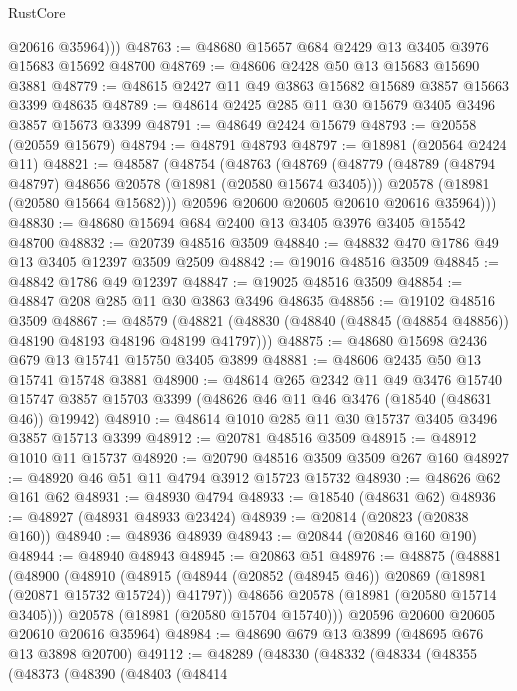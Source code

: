 \begin{lexlean}{RustCore}
\begin{coremodule}
          @20616
          @35964)))
@48763 := @48680 @15657 @684 @2429 @13 @3405 @3976 @15683 @15692 @48700
@48769 := @48606 @2428 @50 @13 @15683 @15690 @3881
@48779 := @48615 @2427 @11 @49 @3863 @15682 @15689 @3857 @15663 @3399 @48635
@48789 := @48614 @2425 @285 @11 @30 @15679 @3405 @3496 @3857 @15673 @3399
@48791 := @48649 @2424 @15679
@48793 := @20558 (@20559 @15679)
@48794 := @48791 @48793
@48797 := @18981 (@20564 @2424 @11)
@48821 := @48587
    (@48754
      (@48763
        (@48769
          (@48779
            (@48789 (@48794 @48797) @48656 @20578 (@18981 (@20580 @15674 @3405)))
            @20578
            (@18981 (@20580 @15664 @15682)))
          @20596
          @20600
          @20605
          @20610
          @20616
          @35964)))
@48830 := @48680 @15694 @684 @2400 @13 @3405 @3976 @3405 @15542 @48700
@48832 := @20739 @48516 @3509
@48840 := @48832 @470 @1786 @49 @13 @3405 @12397 @3509 @2509
@48842 := @19016 @48516 @3509
@48845 := @48842 @1786 @49 @12397
@48847 := @19025 @48516 @3509
@48854 := @48847 @208 @285 @11 @30 @3863 @3496 @48635
@48856 := @19102 @48516 @3509
@48867 := @48579
    (@48821 (@48830 (@48840 (@48845 (@48854 @48856)) @48190 @48193 @48196 @48199 @41797)))
@48875 := @48680 @15698 @2436 @679 @13 @15741 @15750 @3405 @3899
@48881 := @48606 @2435 @50 @13 @15741 @15748 @3881
@48900 := @48614
    @265
    @2342
    @11
    @49
    @3476
    @15740
    @15747
    @3857
    @15703
    @3399
    (@48626 @46 @11 @46 @3476 (@18540 (@48631 @46)) @19942)
@48910 := @48614 @1010 @285 @11 @30 @15737 @3405 @3496 @3857 @15713 @3399
@48912 := @20781 @48516 @3509
@48915 := @48912 @1010 @11 @15737
@48920 := @20790 @48516 @3509 @3509 @267 @160
@48927 := @48920 @46 @51 @11 @4794 @3912 @15723 @15732
@48930 := @48626 @62 @161 @62
@48931 := @48930 @4794
@48933 := @18540 (@48631 @62)
@48936 := @48927 (@48931 @48933 @23424)
@48939 := @20814 (@20823 (@20838 @160))
@48940 := @48936 @48939
@48943 := @20844 (@20846 @160 @190)
@48944 := @48940 @48943
@48945 := @20863 @51
@48976 := @48875
    (@48881
      (@48900
        (@48910
          (@48915 (@48944 (@20852 (@48945 @46)) @20869 (@18981 (@20871 @15732 @15724)) @41797))
          @48656
          @20578
          (@18981 (@20580 @15714 @3405)))
        @20578
        (@18981 (@20580 @15704 @15740)))
      @20596
      @20600
      @20605
      @20610
      @20616
      @35964)
@48984 := @48690 @679 @13 @3899 (@48695 @676 @13 @3898 @20700)
@49112 := @48289
    (@48330
      (@48332
        (@48334
          (@48355
            (@48373
              (@48390
                (@48403
                  (@48414

\end{coremodule}
\end{lexlean}
